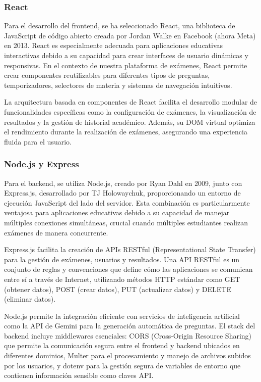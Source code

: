 \documentclass[12pt,a4paper]{report}
\begin{document}
\subsubsection{React}

Para el desarrollo del frontend, se ha seleccionado React, una biblioteca de JavaScript de código abierto creada por Jordan Walke en Facebook (ahora Meta) en 2013. React es especialmente adecuada para aplicaciones educativas interactivas debido a su capacidad para crear interfaces de usuario dinámicas y responsivas. En el contexto de nuestra plataforma de exámenes, React permite crear componentes reutilizables para diferentes tipos de preguntas, temporizadores, selectores de materia y sistemas de navegación intuitivos.

La arquitectura basada en componentes de React facilita el desarrollo modular de funcionalidades específicas como la configuración de exámenes, la visualización de resultados y la gestión de historial académico. Además, su DOM virtual optimiza el rendimiento durante la realización de exámenes, asegurando una experiencia fluida para el usuario.

\subsubsection{Node.js y Express}

Para el backend, se utiliza Node.js, creado por Ryan Dahl en 2009, junto con Express.js, desarrollado por TJ Holowaychuk, proporcionando un entorno de ejecución JavaScript del lado del servidor. Esta combinación es particularmente ventajosa para aplicaciones educativas debido a su capacidad de manejar múltiples conexiones simultáneas, crucial cuando múltiples estudiantes realizan exámenes de manera concurrente.

Express.js facilita la creación de APIs RESTful (Representational State Transfer) para la gestión de exámenes, usuarios y resultados. Una API RESTful es un conjunto de reglas y convenciones que define cómo las aplicaciones se comunican entre sí a través de Internet, utilizando métodos HTTP estándar como GET (obtener datos), POST (crear datos), PUT (actualizar datos) y DELETE (eliminar datos). 

Node.js permite la integración eficiente con servicios de inteligencia artificial como la API de Gemini para la generación automática de preguntas. El stack del backend incluye middlewares esenciales: CORS (Cross-Origin Resource Sharing) que permite la comunicación segura entre el frontend y backend ubicados en diferentes dominios, Multer para el procesamiento y manejo de archivos subidos por los usuarios, y dotenv para la gestión segura de variables de entorno que contienen información sensible como claves API.
\end{document}
